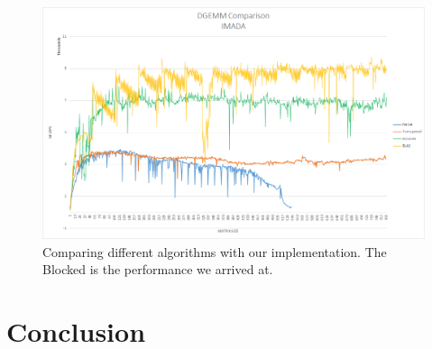 \documentclass[a4paper,11pt,oneside]{book}
\begin{document}
\begin{figure}[H]
  \centering
  \includegraphics[width=0.9\linewidth]{comparison-graph-imada.png}
  \caption{Comparing different algorithms with our implementation. The Blocked is the performance we arrived at.}
  \centering
  \label{fig:sub1}
\end{figure}


\chapter{Conclusion}


\end{document}
